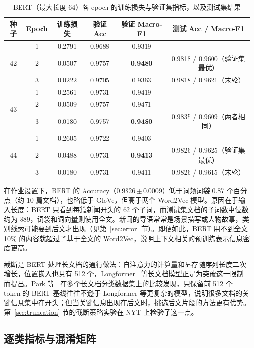 \documentclass[lang=cn,a4paper]{elegantpaper}
\newcommand{\pmstd}[2]{#1\,$\pm$\,#2}
\begin{document}
\begin{table}[htbp]
  \centering
  \caption{BERT（最大长度 64）各 epoch 的训练损失与验证集指标，以及测试集结果}
  \label{tab:bert-epoch}
  \begin{tabular}{cccccc}
    \toprule
    种子 & Epoch & 训练损失 & 验证 Acc & 验证 Macro-F1 & 测试 Acc / Macro-F1 \\
    \midrule
    \multirow{3}{*}{42} & 1 & 0.2791 & 0.9688 & 0.9319 & \\
     & 2 & 0.0507 & 0.9757 & \textbf{0.9480} & 0.9818 / 0.9600（验证集最优）\\
     & 3 & 0.0222 & 0.9705 & 0.9363 & 0.9818 / 0.9621（末轮）\\
    \midrule
    \multirow{3}{*}{43} & 1 & 0.2561 & 0.9731 & 0.9419 & \\
     & 2 & 0.0509 & 0.9757 & 0.9471 & \\
     & 3 & 0.0180 & 0.9757 & \textbf{0.9480} & 0.9835 / 0.9609（两者相同）\\
    \midrule
    \multirow{3}{*}{44} & 1 & 0.2605 & 0.9722 & 0.9403 & \\
     & 2 & 0.0488 & 0.9731 & \textbf{0.9413} & 0.9826 / 0.9625（验证集最优）\\
     & 3 & 0.0180 & 0.9731 & 0.9411 & 0.9826 / 0.9615（末轮）\\
    \bottomrule
  \end{tabular}
\end{table}

在作业设置下，BERT 的 Accuracy（\pmstd{0.9826}{0.0009}）低于词频词袋 0.87 个百分点（约 10 篇文档），也略低于 GloVe，但高于两个 Word2Vec 模型。原因在于输入长度：BERT 只看到每篇新闻开头的 62 个子词，而测试集文档的子词数中位数约为 889，词袋和词向量则使用全文。新闻的导语常常是场景描写或人物故事，类别线索可能要到后文才出现（见第~\ref{sec:error} 节）。即便如此，BERT 用不到全文 10\% 的内容就超过了基于全文的 Word2Vec，说明上下文相关的预训练表示信息密度更高。

截断是 BERT 处理长文档的通行做法：自注意力的计算量和显存随序列长度二次增长，位置嵌入也只有 512 个，Longformer~\cite{beltagy2020longformer} 等长文档模型正是为突破这一限制而提出。Park 等~\cite{park2022efficient} 在多个长文档分类数据集上的比较发现，只保留前 512 个 token 的 BERT 基线往往不逊于 Longformer 等更复杂的模型，说明很多文档的关键信息集中在开头；但当关键信息出现在后文时，挑选后文片段的方法更有优势。第~\ref{sec:truncation} 节的截断策略实验在 NYT 上检验了这一点。

\subsection{逐类指标与混淆矩阵}
\label{sec:perclass}
\end{document}
